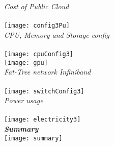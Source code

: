 \documentclass[1pt]{article}
\begin{document}
\emph{Cost of Public Cloud }\\
\\
\texttt{[image: config3Pu]}\\

\emph{CPU, Memory and Storage config }\\
\\
\texttt{[image: cpuConfig3]}\\
\texttt{[image: gpu]}\\

\emph{Fat-Tree network Infiniband}\\
\\
\texttt{[image: switchConfig3]}\\

\emph{Power usage}\\
\\
\texttt{[image: electricity3]}\\

\textbf{\emph{Summary}}
\\
\texttt{[image: summary]}\\
\end{document}

